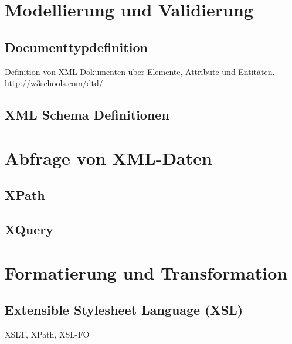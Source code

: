 %
%
%
\section{Modellierung und Validierung}

\subsection{Documenttypdefinition}

Definition von XML-Dokumenten über Elemente, Attribute und Entitäten.
http://w3schools.com/dtd/

\subsection{XML Schema Definitionen}


\section{Abfrage von XML-Daten}

\subsection{XPath}
\subsection{XQuery}


\section{Formatierung und Transformation}

\subsection{Extensible Stylesheet Language (XSL)}

XSLT, XPath, XSL-FO

